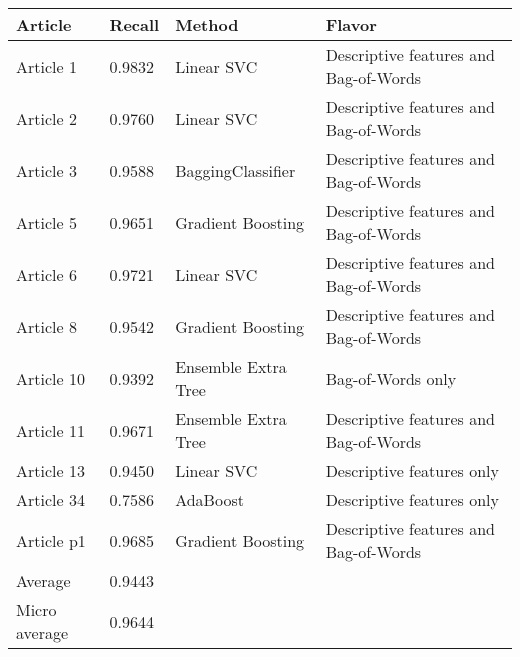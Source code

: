 \begin{tabular}{|l|l|l|l| }
\hline
Article & Recall & Method & Flavor \\ \hline
Article 1 & 0.9832 & Linear SVC & Descriptive features and Bag-of-Words\\
Article 2 & 0.9760 & Linear SVC & Descriptive features and Bag-of-Words\\
Article 3 & 0.9588 & BaggingClassifier & Descriptive features and Bag-of-Words\\
Article 5 & 0.9651 & Gradient Boosting & Descriptive features and Bag-of-Words\\
Article 6 & 0.9721 & Linear SVC & Descriptive features and Bag-of-Words\\
Article 8 & 0.9542 & Gradient Boosting & Descriptive features and Bag-of-Words\\
Article 10 & 0.9392 & Ensemble Extra Tree & Bag-of-Words only\\
Article 11 & 0.9671 & Ensemble Extra Tree & Descriptive features and Bag-of-Words\\
Article 13 & 0.9450 & Linear SVC & Descriptive features only\\
Article 34 & 0.7586 & AdaBoost & Descriptive features only\\
Article p1 & 0.9685 & Gradient Boosting & Descriptive features and Bag-of-Words\\
Average & 0.9443 & & \\
Micro average & 0.9644 & & \\
\hline
\end{tabular}
